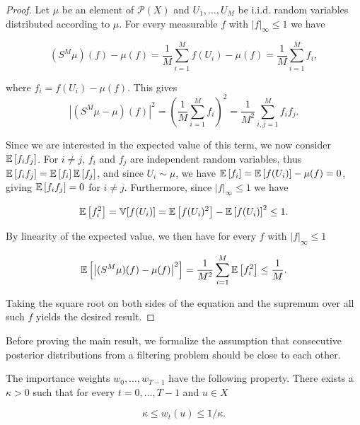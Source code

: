 \begin{proof}
  Let $\mu$ be an element of $\mathcal{P}(X)$ and $U_1, \ldots, U_M$ be i.i.d. random variables distributed according to $\mu$. For every measurable $f$ with $|f|_\infty \le 1$ we have 
  
  \begin{equation*}
    (S^M\mu)(f) - \mu(f) = \frac1{M}\sum_{i=1}^Mf(U_i) - \mu(f) = \frac1{M}\sum_{i=1}^Mf_i,
  \end{equation*}

  where $f_i = f(U_i) - \mu(f)$. This gives
  \begin{equation*}
    \left|(S^M\mu - \mu)(f)\right|^2
    = \left(\frac1{M}\sum_{i=1}^Mf_i\right)^2
    = \frac1{M^2}\sum_{i,j=1}^Mf_if_j.
  \end{equation*}

  Since we are interested in the expected value of this term, we now consider $\mathbb{E}\left[f_if_j\right]$. For $i \neq j$, $f_i$ and $f_j$ are independent random variables, thus $\mathbb{E}\left[f_if_j\right] = \mathbb{E}\left[f_i\right]\mathbb{E}\left[f_j\right]$, and since $U_i \sim \mu$, we have $\mathbb{E}\left[f_i\right] = \mathbb{E}\left[f(U_i)\right] - \mu(f) = 0$, giving $\mathbb{E}\left[f_if_j\right] = 0$ for $i \neq j$. Furthermore, since $|f|_\infty \le 1$ we have

  \begin{equation*}
    \mathbb{E}\left[f_i^2\right] = \mathbb{V}[f(U_i)] = \mathbb{E}\left[f(U_i)^2\right] - \mathbb{E}\left[f(U_i)\right]^2 \leq 1.
  \end{equation*}

  By linearity of the expected value, we then have for every $f$ with $|f|_\infty \le 1$

  \begin{equation*}
    \mathbb{E}\left[\left|(S^M\mu)(f) - \mu(f)\right|^2\right] = \frac1{M^2}\sum_{i=1}^M\mathbb{E}\left[f_i^2\right] \le \frac1{M}.
  \end{equation*}

  Taking the square root on both sides of the equation and the supremum over all such $f$ yields the desired result.
\end{proof}

Before proving the main result, we formalize the assumption that consecutive posterior distributions from a filtering problem should be close to each other.

\begin{assumption}\label{kappa-assumption}
  The importance weights $w_0, \ldots, w_{T-1}$ have the following property. There exists a $\kappa > 0$ such that for every $t = 0, \ldots, T-1$ and $u \in X$

  \begin{equation*}
    \kappa \leq w_t(u) \leq 1/\kappa.
  \end{equation*}
\end{assumption}

